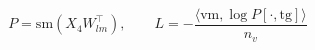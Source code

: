 \documentclass{article}
\begin{document}
\begin{preview}

\[ P = \mathrm{sm}(X_4 W_{lm}^\top),\qquad L = -\dfrac{\langle \mathrm{vm}, \log P[\cdot, \mathrm{tg}]\rangle}{n_v} \]

\end{preview}
\end{document}
